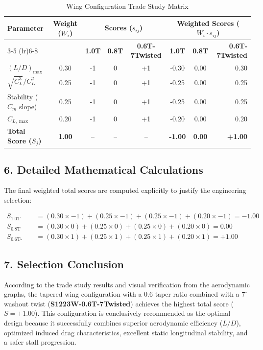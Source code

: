 \documentclass{article}
\begin{document}
\begin{table}[h!]
\centering
\caption{Wing Configuration Trade Study Matrix}
\label{tab:trade_matrix}
\begin{tabular}{lccccccr}
\toprule
\multirow{2}{*}{\textbf{Parameter}} & \multirow{2}{*}{\textbf{Weight ($W_i$)}} & \multicolumn{3}{c}{\textbf{Scores ($s_{ij}$)}} & \multicolumn{3}{c}{\textbf{Weighted Scores ($W_i \cdot s_{ij}$)}} \\
\cmidrule(lr){3-5} \cmidrule(lr){6-8}
& & \textbf{1.0T} & \textbf{0.8T} & \textbf{0.6T-7Twisted} & \textbf{1.0T} & \textbf{0.8T} & \textbf{0.6T-7Twisted} \\
\midrule
$(L/D)_{\max}$          & 0.30 & -1 & 0  & +1 & -0.30 & 0.00  & 0.30 \\
$\sqrt{C_L^3}/C_D^2$   & 0.25 & -1 & 0  & +1 & -0.25 & 0.00  & 0.25 \\
Stability ($C_m$ slope) & 0.25 & -1 & 0  & +1 & -0.25 & 0.00  & 0.25 \\
$C_{L,\max}$            & 0.20 & -1 & 0  & +1 & -0.20 & 0.00  & 0.20 \\
\midrule
\textbf{Total Score ($S_j$)} & \textbf{1.00} & -- & -- & -- & \textbf{-1.00} & \textbf{0.00} & \textbf{+1.00} \\
\bottomrule
\end{tabular}
\end{table}

\subsection*{6. Detailed Mathematical Calculations}
The final weighted total scores are computed explicitly to justify the engineering selection:

\begin{align}
    S_{\text{1.0T}}               &= (0.30 \times -1) + (0.25 \times -1) + (0.25 \times -1) + (0.20 \times -1) = \mathbf{-1.00} \\
    S_{\text{0.8T}}               &= (0.30 \times 0)  + (0.25 \times 0)  + (0.25 \times 0)  + (0.20 \times 0)  = \mathbf{0.00}  \\
    S_{\text{0.6T-7Twisted}}      &= (0.30 \times 1)  + (0.25 \times 1)  + (0.25 \times 1)  + (0.20 \times 1)  = \mathbf{+1.00}
\end{align}

\subsection*{7. Selection Conclusion}
According to the trade study results and visual verification from the aerodynamic graphs, the tapered wing configuration with a $0.6$ taper ratio combined with a $7^\circ$ washout twist (\textbf{S1223W-0.6T-7Twisted}) achieves the highest total score ($S = +1.00$). This configuration is conclusively recommended as the optimal design because it successfully combines superior aerodynamic efficiency ($L/D$), optimized induced drag characteristics, excellent static longitudinal stability, and a safer stall progression.
\end{document}
